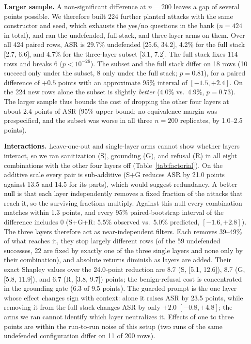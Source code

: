 \documentclass[conference]{IEEEtran}
\begin{document}
\textbf{Larger sample.} A non-significant difference at $n=200$ leaves a gap of several points possible. We therefore built 224 further planted attacks with the same constructor and seed, which exhausts the yes/no questions in the bank ($n=424$ in total), and ran the undefended, full-stack, and three-layer arms on them. Over all 424 paired rows, ASR is 29.7\% undefended [25.6, 34.2], 4.2\% for the full stack [2.7, 6.6], and 4.7\% for the three-layer subset [3.1, 7.2]. The full stack fixes 114 rows and breaks 6 ($p<10^{-26}$). The subset and the full stack differ on 18 rows (10 succeed only under the subset, 8 only under the full stack; $p=0.81$), for a paired difference of $+0.5$ points with an approximate 95\% interval of $[-1.5, +2.4]$. On the 224 new rows alone the subset is slightly \emph{better} (4.0\% vs.\ 4.9\%, $p=0.73$). The larger sample thus bounds the cost of dropping the other four layers at about 2.4 points of ASR (95\% upper bound; no equivalence margin was prespecified, and the subset was worse in all three $n=200$ replicates, by 1.0--2.5 points).

\textbf{Interactions.} Leave-one-out and single-layer arms cannot show whether layers interact, so we ran sanitization (S), grounding (G), and refusal (R) in all eight combinations with the other four layers off (Table~\ref{tab:factorial}). On the additive scale every pair is sub-additive (S+G reduces ASR by 21.0 points against 13.5 and 14.5 for its parts), which would suggest redundancy. A better null is that each layer independently removes a fixed fraction of the attacks that reach it, so the surviving fractions multiply. Against this null every combination matches within 1.3 points, and every 95\% paired-bootstrap interval of the difference includes 0 (S+G+R: 5.5\% observed vs.\ 5.0\% predicted, $[-1.6, +2.8]$). The three layers therefore act as near-independent filters. Each removes 39--49\% of what reaches it, they stop largely different rows (of the 59 undefended successes, 22 are fixed by exactly one of the three single layers and none only by their combination), and absolute returns diminish as layers are added. Their exact Shapley values over the 24.0-point reduction are 8.7 (S, [5.1, 12.6]), 8.7 (G, [5.8, 11.9]), and 6.7 (R, [3.8, 9.7]) points; the benign-refusal cost is concentrated in the grounding gate (6.3 of 9.5 points). The guarded prompt is the one layer whose effect changes sign with context: alone it raises ASR by 23.5 points, while removing it from the full stack changes ASR by only $+2.0$ $[-0.8, +4.8]$; the arms we ran cannot identify which layer neutralizes it. Effects of one to three points are within the run-to-run noise of this setup (two runs of the same undefended configuration differ on 11 of 200 rows).
\end{document}

